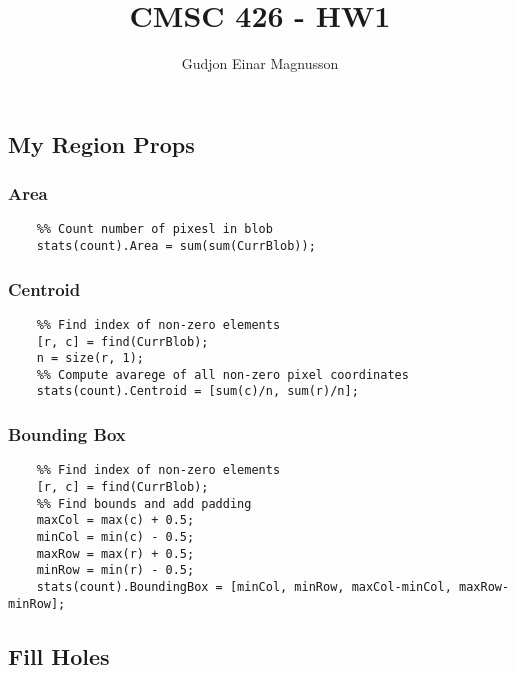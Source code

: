 \documentclass[12pt]{article}
\begin{document}
\title{CMSC 426 - HW1}
\author{Gudjon Einar Magnusson}

\maketitle

\section{}

\subsection{My Region Props}

\subsubsection{Area}
\begin{minipage}{\linewidth}
\begin{lstlisting}
    %% Count number of pixesl in blob
    stats(count).Area = sum(sum(CurrBlob));
\end{lstlisting}
\end{minipage}

\subsubsection{Centroid}
\begin{minipage}{\linewidth}
\begin{lstlisting}
    %% Find index of non-zero elements
    [r, c] = find(CurrBlob);
    n = size(r, 1);
    %% Compute avarege of all non-zero pixel coordinates
    stats(count).Centroid = [sum(c)/n, sum(r)/n];
\end{lstlisting}
\end{minipage}

\subsubsection{Bounding Box}
\begin{minipage}{\linewidth}
\begin{lstlisting}
    %% Find index of non-zero elements
    [r, c] = find(CurrBlob);
    %% Find bounds and add padding
    maxCol = max(c) + 0.5;
    minCol = min(c) - 0.5;
    maxRow = max(r) + 0.5;
    minRow = min(r) - 0.5;
    stats(count).BoundingBox = [minCol, minRow, maxCol-minCol, maxRow-minRow];
\end{lstlisting}
\end{minipage}


\subsection{Fill Holes}


\section{}
\end{document}
